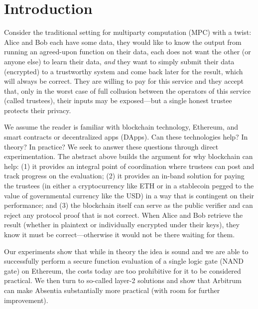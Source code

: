 


\section{Introduction}

Consider the traditional setting for multiparty computation (MPC) with a twist: Alice and Bob each have some data, they would like to know the output from running an agreed-upon function on their data, each does not want the other (or anyone else) to learn their data, \emph{and} they want to simply submit their data (\eg encrypted) to a trustworthy system and come back later for the result, which will always be correct. They are willing to pay for this service and they accept that, only in the worst case of full collusion between the operators of this service (called trustees), their inputs may be exposed---but a single honest trustee protects their privacy.

We assume the reader is familiar with blockchain technology, Ethereum, and smart contracts or decentralized apps (DApps). Can these technologies help? In theory? In practice? We seek to answer these questions through direct experimentation. The abstract above builds the argument for why blockchain can help: (1) it provides an integral point of coordination where trustees can post and track progress on the evaluation; (2) it provides an in-band solution for paying the trustees (in either a cryptocurrency like ETH or in a stablecoin pegged to the value of governmental currency like the USD) in a way that is contingent on their performance; and (3) the blockchain itself can serve as the public verifier and can reject any protocol proof that is not correct. When Alice and Bob retrieve the result (whether in plaintext or individually encrypted under their keys), they know it must be correct---otherwise it would not be there waiting for them.

Our experiments show that while in theory the idea is sound and we are able to successfully perform a secure function evaluation of a single logic gate (NAND gate) on Ethereum, the costs today are too prohibitive for it to be considered practical. We then turn to so-called layer-2 solutions and show that Arbitrum~\cite{KGCWF18} can make Absentia substantially more practical (with room for further improvement).
 
